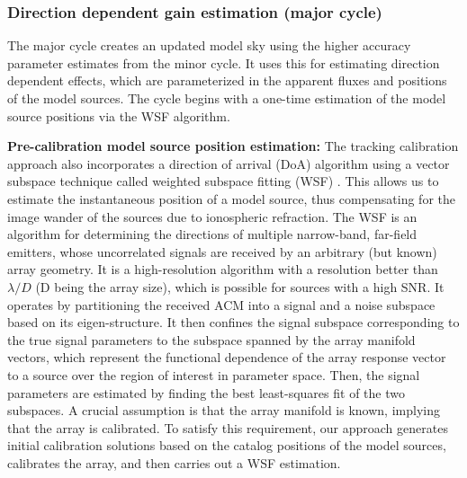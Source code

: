 \documentclass{aa}
\begin{document}
\subsubsection{\label{sub:Direction-dependent-gain}Direction dependent gain estimation (major cycle)}  

The major cycle creates an updated model sky using the higher accuracy parameter
estimates from the minor cycle.  It uses this for estimating direction dependent
effects, which  are parameterized  in the apparent  fluxes and positions  of the
model sources. The  cycle begins with a one-time estimation  of the model source
positions via the WSF algorithm.


\textbf{Pre-calibration   model  source   position  estimation:}   The  tracking
calibration approach  also incorporates a  direction of arrival  (DoA) algorithm
using  a  vector  subspace  technique  called weighted  subspace  fitting  (WSF)
\citep{viberg1991detection}.   This  allows  us  to estimate  the  instantaneous
position  of a  model source,  thus  compensating for  the image  wander of  the
sources due to  ionospheric refraction. The WSF is  an algorithm for determining
the directions  of multiple narrow-band, far-field  emitters, whose uncorrelated
signals  are received  by an  arbitrary  (but known)  array geometry.   It is  a
\mbox{high-resolution} algorithm  with a  resolution better than  $\lambda/D$ (D
being  the array  size),  which is  possible for  sources  with a  high SNR.  It
operates by  partitioning the received  ACM into a  signal and a  noise subspace
based   on  its  eigen-structure.    It  then   confines  the   signal  subspace
corresponding to the true signal parameters to the subspace spanned by the array
manifold  vectors,  which  represent  the  functional dependence  of  the  array
response vector  to a  source over  the region of  interest in  parameter space.
Then, the signal parameters are  estimated by finding the best least-squares fit
of the two subspaces. A crucial  assumption is that the array manifold is known,
implying  that  the array  is  calibrated.   To  satisfy this  requirement,  our
approach generates initial calibration  solutions based on the catalog positions
of  the  model  sources,  calibrates  the  array, and  then  carries  out  a  WSF
estimation.

\end{document}
